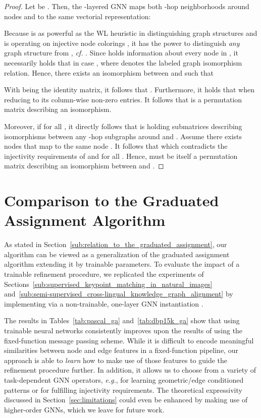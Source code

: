 \documentclass{article}
\def\eg{\emph{e.g.}} \def\Eg{\emph{E.g.}}  \def\ie{\emph{i.e.}} \def\Ie{\emph{I.e.}}  \def\cf{\emph{cf.}}  \def\Cf{\emph{Cf.}}
\begin{document}
\begin{proof}
  Let be .
  Then, the -layered GNN  maps both -hop neighborhoods around nodes  and  to the same vectorial representation:
  
  Because  is as powerful as the WL heuristic in distinguishing graph structures \citep{Xu/etal/2019b,Morris/etal/2019} and is operating on injective node colorings , it has the power to distinguish \emph{any} graph structure from , \cf{} \citep{Murphy/etal/2019}.
  Since  holds information about every node in , it necessarily holds that  in case , where  denotes the labeled graph isomorphism relation.
  Hence, there exists an isomorphism  between  and  such that
  
  With  being the identity matrix, it follows that .
  Furthermore, it holds that  when reducing  to its column-wise non-zero entries.
  It follows that  is a permutation matrix describing an isomorphism.

  Moreover, if  for all , it directly follows that  is holding submatrices describing isomorphisms between any -hop subgraphs around  and .
  Assume there exists nodes  that map to the same node .
  It follows that  which contradicts the injectivity requirements of  and  for all .
  Hence,  must be itself a permutation matrix describing an isomorphism between  and .
\end{proof}

\section{Comparison to the Graduated Assignment Algorithm}\label{sec:comparison_to_the_graduated_assignment_algorithm}

As stated in Section~\ref{sub:relation_to_the_graduated_assignment}, our algorithm can be viewed as a generalization of the graduated assignment algorithm \citep{Gold/Rangarajan/1996} extending it by trainable parameters.
To evaluate the impact of a trainable refinement procedure, we replicated the experiments of Sections~\ref{sub:supervised_keypoint_matching_in_natural_images} and~\ref{sub:semi-supervised_cross-lingual_knowledge_graph_alignment} by implementing  via a non-trainable, one-layer GNN instantiation .

The results in Tables~\ref{tab:pascal_ga} and~\ref{tab:dbp15k_ga} show that using trainable neural networks  consistently improves upon the results of using the fixed-function message passing scheme.
While it is difficult to encode meaningful similarities between node and edge features in a fixed-function pipeline, our approach is able to \emph{learn} how to make use of those features to guide the refinement procedure further.
In addition, it allows us to choose from a variety of task-dependent GNN operators, \eg, for learning geometric/edge conditioned patterns or for fulfilling injectivity requirements.
The theoretical expressivity discussed in Section~\ref{sec:limitations} could even be enhanced by making use of higher-order GNNs, which we leave for future work.
\end{document}
